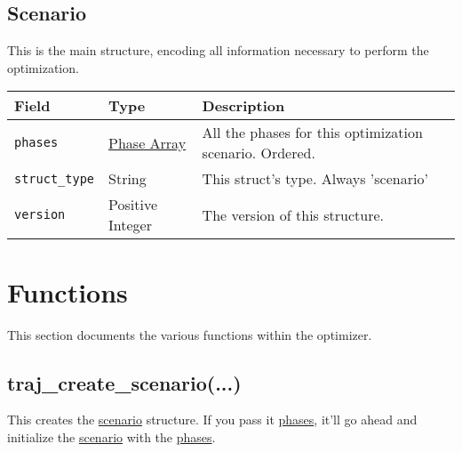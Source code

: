 \documentclass{article}
\begin{document}
		\subsection{Scenario}
			\label{sec:scenario} %

			This is the main structure, encoding all information necessary to perform the optimization.

			\vspace{\baselineskip}

			\begin{tabular}{ p{} | p{} | p{197pt}}
				Field                    & Type                               & Description                                      \\ \hline
				\lstinline|phases| & \raggedright \hyperref[sec:phase]{Phase Array} & All the phases for this optimization scenario.
				                                                                Ordered.                                         \\[1ex]
				\lstinline|struct_type|  & String                             & This struct's type. Always 'scenario'            \\[1ex]
				\lstinline|version|      & \raggedright Positive Integer      & The version of this structure.
			\end{tabular}

	\section{Functions}
		This section documents the various functions within the optimizer.

		\subsection{traj\_create\_scenario(...)}
			This creates the \hyperref[sec:scenario]{scenario} structure. If you pass it \hyperref[sec:phase]{phases},
			it'll go ahead and initialize the \hyperref[sec:scenario]{scenario}
			with the \hyperref[sec:phase]{phases}.
\end{document}
